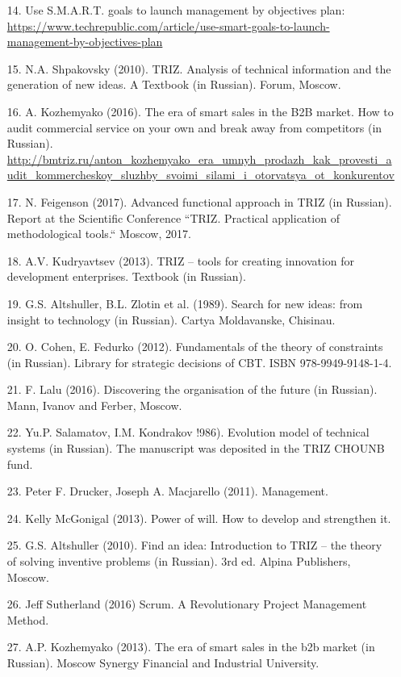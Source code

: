 \documentclass[11pt,a4paper]{book}
\begin{document}
\begin{itemize}
\item[14.] Use S.M.A.R.T. goals to launch management by objectives plan:
  \url{https://www.techrepublic.com/article/use-smart-goals-to-launch-management-by-objectives-plan} 
\item[15.] N.A. Shpakovsky (2010). TRIZ. Analysis of technical information and
  the generation of new ideas. A Textbook (in Russian).  Forum, Moscow.
\item[16.] A. Kozhemyako (2016). The era of smart sales in the B2B market. How
  to audit commercial service on your own and break away from competitors (in
  Russian). \url{http://bmtriz.ru/anton_kozhemyako_era_umnyh_prodazh_kak_provesti_audit_kommercheskoy_sluzhby_svoimi_silami_i_otorvatsya_ot_konkurentov}
\item[17.] N. Feigenson (2017). Advanced functional approach in TRIZ (in
  Russian).  Report at the Scientific Conference “TRIZ. Practical application
  of methodological tools.“ Moscow, 2017.
\item[18.] A.V. Kudryavtsev (2013).  TRIZ -- tools for creating innovation for
  development enterprises. Textbook (in Russian).
\item[19.] G.S. Altshuller, B.L. Zlotin et al. (1989). Search for new ideas:
  from insight to technology (in Russian). Cartya Moldavanske, Chisinau.
\item[20.] O. Cohen, E. Fedurko (2012). Fundamentals of the theory of
  constraints (in Russian). Library for strategic decisions of CBT. ISBN
  978-9949-9148-1-4.
\item[21.] F. Lalu (2016). Discovering the organisation of the future (in
  Russian).  Mann, Ivanov and Ferber, Moscow.
\item[22.] Yu.P. Salamatov, I.M. Kondrakov !986). Evolution model of technical
  systems (in Russian). The manuscript was deposited in the TRIZ CHOUNB fund.
\item[23.] Peter F. Drucker, Joseph A. Macjarello (2011). Management. 
\item[24.] Kelly McGonigal (2013). Power of will. How to develop and
  strengthen it.
\item[25.] G.S. Altshuller (2010). Find an idea: Introduction to TRIZ -- the
  theory of solving inventive problems (in Russian). 3rd ed. Alpina
  Publishers, Moscow.
\item[26.] Jeff Sutherland (2016) Scrum. A Revolutionary Project Management
  Method.
\item[27.] A.P. Kozhemyako (2013). The era of smart sales in the b2b market
  (in Russian). Moscow Synergy Financial and Industrial University.

\end{itemize}
\end{document}
